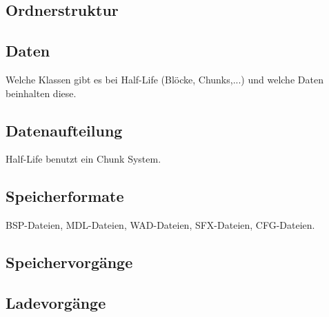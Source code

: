 \subsection{Ordnerstruktur}
\subsection{Daten}
Welche Klassen gibt es bei Half-Life (Blöcke, Chunks,...) und welche Daten 
beinhalten diese.

\subsection{Datenaufteilung}
Half-Life benutzt ein Chunk System.

\subsection{Speicherformate}
BSP-Dateien, MDL-Dateien, WAD-Dateien, SFX-Dateien, CFG-Dateien.

\subsection{Speichervorgänge}

\subsection{Ladevorgänge}